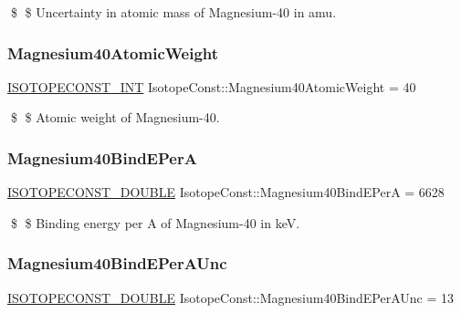\$ \$ Uncertainty in atomic mass of Magnesium-\/40 in amu. \mbox{\label{group___isotope_const-_magnesium-_mg40_ga7ddf19424ac4cf8d4146e661da56b67c}} 
\subsubsection{\texorpdfstring{Magnesium40\+Atomic\+Weight}{Magnesium40AtomicWeight}}
{\footnotesize\ttfamily \mbox{\hyperlink{group___isotope_const-_macros_ga5f18360b3e99483a35c32d789e62621c}{I\+S\+O\+T\+O\+P\+E\+C\+O\+N\+S\+T\+\_\+\+I\+NT}} Isotope\+Const\+::\+Magnesium40\+Atomic\+Weight = 40}

\$ \$ Atomic weight of Magnesium-\/40. \mbox{\label{group___isotope_const-_magnesium-_mg40_gab4d14be5f53008c6e03cd263d206597e}} 
\subsubsection{\texorpdfstring{Magnesium40\+Bind\+E\+PerA}{Magnesium40BindEPerA}}
{\footnotesize\ttfamily \mbox{\hyperlink{group___isotope_const-_macros_ga8f45a7272ce02c0b4c65c44636ed719a}{I\+S\+O\+T\+O\+P\+E\+C\+O\+N\+S\+T\+\_\+\+D\+O\+U\+B\+LE}} Isotope\+Const\+::\+Magnesium40\+Bind\+E\+PerA = 6628}

\$ \$ Binding energy per A of Magnesium-\/40 in keV. \mbox{\label{group___isotope_const-_magnesium-_mg40_gaa83d395215afed9b8d2cfedea14bf5bf}} 
\subsubsection{\texorpdfstring{Magnesium40\+Bind\+E\+Per\+A\+Unc}{Magnesium40BindEPerAUnc}}
{\footnotesize\ttfamily \mbox{\hyperlink{group___isotope_const-_macros_ga8f45a7272ce02c0b4c65c44636ed719a}{I\+S\+O\+T\+O\+P\+E\+C\+O\+N\+S\+T\+\_\+\+D\+O\+U\+B\+LE}} Isotope\+Const\+::\+Magnesium40\+Bind\+E\+Per\+A\+Unc = 13}

